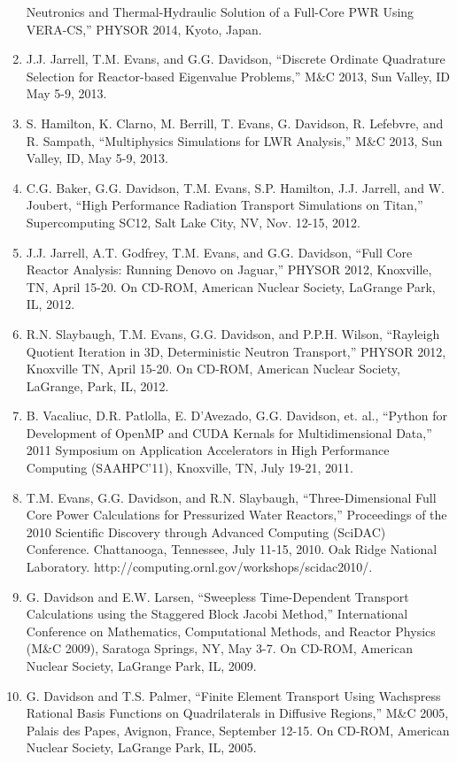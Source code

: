 \documentclass[letterpaper,11pt]{article}
\begin{document}
\begin{enumerate}
    Neutronics and Thermal-Hydraulic Solution of a Full-Core PWR Using
    VERA-CS,'' PHYSOR 2014, Kyoto, Japan.
  \item J.J. Jarrell, T.M. Evans, and G.G. Davidson, ``Discrete
    Ordinate Quadrature Selection for Reactor-based Eigenvalue
    Problems,'' M\&C 2013, Sun Valley, ID May 5-9, 2013.
  \item S. Hamilton, K. Clarno, M. Berrill, T. Evans, G. Davidson,
    R. Lefebvre, and R. Sampath, ``Multiphysics Simulations for LWR
    Analysis,'' M\&C 2013, Sun Valley, ID, May 5-9, 2013.
  \item C.G. Baker, G.G. Davidson, T.M. Evans, S.P. Hamilton,
    J.J. Jarrell, and W. Joubert, ``High Performance Radiation
    Transport Simulations on Titan,'' Supercomputing SC12, Salt Lake
    City, NV, Nov. 12-15, 2012.
  \item J.J. Jarrell, A.T. Godfrey, T.M. Evans, and G.G. Davidson,
    ``Full Core Reactor Analysis: Running Denovo on Jaguar,'' PHYSOR
    2012, Knoxville, TN, April 15-20. On CD-ROM, American Nuclear
    Society, LaGrange Park, IL, 2012.
  \item R.N. Slaybaugh, T.M. Evans, G.G. Davidson, and P.P.H. Wilson,
    ``Rayleigh Quotient Iteration in 3D, Deterministic Neutron
    Transport,'' PHYSOR 2012, Knoxville TN, April 15-20.  On CD-ROM,
    American Nuclear Society, LaGrange, Park, IL, 2012.
  \item B. Vacaliuc, D.R. Patlolla, E. D'Avezado, G.G. Davidson,
    et. al., ``Python for Development of OpenMP and CUDA Kernals for
    Multidimensional Data,'' 2011 Symposium on Application Accelerators
    in High Performance Computing (SAAHPC'11), Knoxville, TN, July
    19-21, 2011.
  \item T.M. Evans, G.G. Davidson, and R.N. Slaybaugh,
    ``Three-Dimensional Full Core Power Calculations for Pressurized
    Water Reactors,'' Proceedings of the 2010 Scientific Discovery
    through Advanced Computing (SciDAC) Conference. Chattanooga,
    Tennessee, July 11-15, 2010. Oak Ridge National
    Laboratory. http://computing.ornl.gov/workshops/scidac2010/.
  \item G. Davidson and E.W. Larsen, ``Sweepless Time-Dependent
    Transport Calculations using the Staggered Block Jacobi Method,''
    International Conference on Mathematics, Computational Methods,
    and Reactor Physics (M\&C 2009), Saratoga Springs, NY, May 3-7.  On
    CD-ROM, American Nuclear Society, LaGrange Park, IL, 2009.
  \item G. Davidson and T.S. Palmer, ``Finite Element Transport Using
    Wachspress Rational Basis Functions on Quadrilaterals in Diffusive
    Regions,'' M\&C 2005, Palais des Papes, Avignon, France, September
    12-15.  On CD-ROM, American Nuclear Society, LaGrange Park, IL,
    2005.
\end{enumerate}
\end{document}
